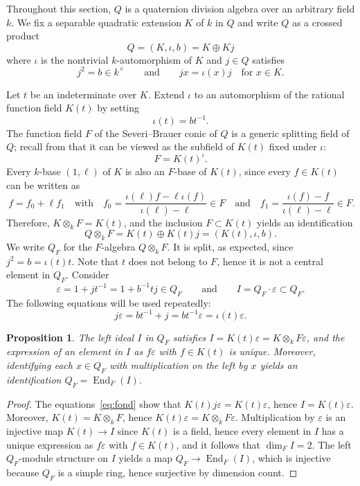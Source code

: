 \documentclass{amsart}
\newcommand{\FQ}{F}
\DeclareMathOperator{\End}{End}
\newtheorem{prop}{Proposition}[section]
\theoremstyle{remark}
\begin{document}
Throughout this section, $Q$ is a quaternion division algebra
over an arbitrary field $k$. We fix a separable quadratic extension
$K$ of $k$ in $Q$ and write $Q$ as a crossed product
\[
  Q= (K,\iota,b) = K\oplus Kj
\]
where $\iota$ is the nontrivial $k$-automorphism of $K$ and $j\in Q$
satisfies
\[
  j^2=b\in k^\times \qquad\text{and}\qquad jx=\iota(x)j \quad\text{for
    $x\in K$.}
\] 

Let $t$ be an indeterminate over $K$. Extend $\iota$ to an
automorphism of the rational function field $K(t)$ by setting
\[
  \iota(t) = bt^{-1}.
\]
The function field $\FQ$ of the Severi--Brauer conic of $Q$ is a
generic splitting field of $Q$; recall from \cite[Remark~A.8]{MT} that
it can be viewed as the subfield of $K(t)$ fixed under $\iota$:
\[
  \FQ=K(t)^\iota.
\]
Every $k$-base $(1,\ell)$ of $K$ is also an $\FQ$-base of $K(t)$,
since every $f\in K(t)$ can be written as
\begin{equation}
  \label{eq:base}\
  f=f_0+\ell f_1 \quad\text{with}\quad
  f_0=\frac{\iota(\ell)f-\ell\iota(f)}{\iota(\ell)-\ell}\in \FQ
  \quad\text{and}\quad
  f_1=\frac{\iota(f)-f}{\iota(\ell)-\ell}\in\FQ.
\end{equation}
Therefore, $K\otimes_k\FQ=K(t)$, and the inclusion $\FQ\subset K(t)$
yields an identification
\[
  Q\otimes_k\FQ = K(t)\oplus K(t)j = (K(t),\iota, b).
\]
We write $Q_\FQ$ for the $\FQ$-algebra $Q\otimes_k\FQ$. 
It is split, as expected, since $j^2=b=\iota(t)t$. Note that $t$ does not belong to $F$, hence it is not a central element in $Q_F$. 
Consider
\[
  \varepsilon = 1+jt^{-1}=1+b^{-1}tj\in Q_{\FQ}
  \qquad\text{and}\qquad
  I=Q_{\FQ}\cdot\varepsilon\subset Q_{\FQ}.
\]
The following equations will be used repeatedly:
\begin{equation}
  \label{eq:fond}
  j\varepsilon = bt^{-1}+j = bt^{-1}\varepsilon=\iota(t)\varepsilon.
\end{equation}

\begin{prop}
  \label{prop:I}
  The left ideal $I$ in $Q_\FQ$ satisfies $I=K(t)\varepsilon=
  K\otimes_k\FQ\varepsilon$, and the expression of an element in $I$
  as $f\varepsilon$ with $f\in K(t)$ is unique. Moreover, identifying
  each $x\in Q_\FQ$ with multiplication on the left by $x$ yields
  an identification $Q_\FQ=\End_\FQ(I)$. 
\end{prop}

\begin{proof}
  The equations~\eqref{eq:fond} show that $K(t)j\varepsilon =
  K(t)\varepsilon$, hence 
  $I=K(t)\varepsilon$. Moreover, $K(t)=K\otimes_k\FQ$, hence
  $K(t)\varepsilon= K\otimes_k\FQ\varepsilon$. Multiplication by
  $\varepsilon$ is an injective map $K(t)\to I$
  since $K(t)$ is a field, hence every element in $I$ has a unique
  expression as $f\varepsilon$ with $f\in K(t)$, and it follows that
  $\dim_\FQ I=2$. The left $Q_\FQ$-module structure on $I$ yields a
  map $Q_\FQ\to\End_\FQ(I)$, which is injective because $Q_\FQ$ is a
  simple ring, hence surjective by dimension count.
\end{proof}
\end{document}

